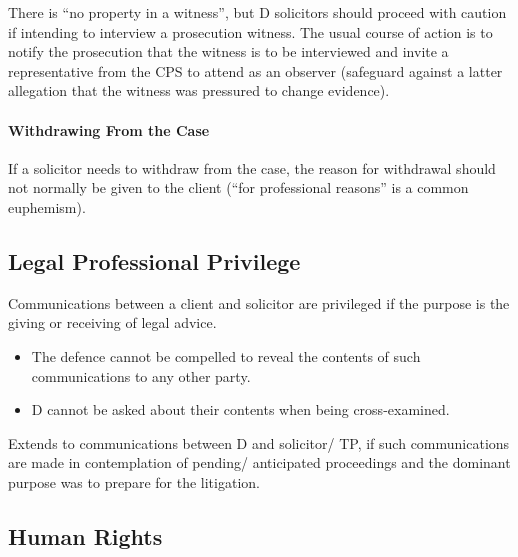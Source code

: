 \documentclass[
]{article}
\providecommand{\tightlist}{%
  \setlength{\itemsep}{0pt}\setlength{\parskip}{0pt}}
\begin{document}
There is ``no property in a witness'', but D solicitors should proceed
with caution if intending to interview a prosecution witness. The usual
course of action is to notify the prosecution that the witness is to be
interviewed and invite a representative from the CPS to attend as an
observer (safeguard against a latter allegation that the witness was
pressured to change evidence).

\hypertarget{withdrawing-from-the-case}{%
\paragraph{Withdrawing From the Case}\label{withdrawing-from-the-case}}

If a solicitor needs to withdraw from the case, the reason for
withdrawal should not normally be given to the client (``for
professional reasons'' is a common euphemism).

\hypertarget{legal-professional-privilege}{%
\subsection{Legal Professional
Privilege}\label{legal-professional-privilege}}

Communications between a client and solicitor are privileged if the
purpose is the giving or receiving of legal advice.

\begin{itemize}
\tightlist
\item
  The defence cannot be compelled to reveal the contents of such
  communications to any other party.
\item
  D cannot be asked about their contents when being cross-examined.
\end{itemize}

Extends to communications between D and solicitor/ TP, if such
communications are made in contemplation of pending/ anticipated
proceedings and the dominant purpose was to prepare for the litigation.

\hypertarget{human-rights}{%
\subsection{Human Rights}\label{human-rights}}
\end{document}
